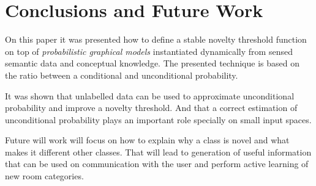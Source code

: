 \documentclass[runningheads,a4paper]{llncs}
\begin{document}
\section{Conclusions and Future Work}

On this paper it was presented how to define a stable novelty threshold function on top of
\emph{probabilistic graphical models} instantiated dynamically from sensed semantic data and
conceptual knowledge.
The presented technique is based on the ratio between a conditional and unconditional probability.

It was shown that unlabelled data can be used to approximate unconditional probability and
improve a novelty threshold.
And that a correct estimation of unconditional probability plays an important role specially on
small input spaces.

Future will work will focus on how to explain why a class is novel and what makes it different
other classes.
That will lead to generation of useful information that can be used on communication with the user
and perform active learning of new room categories.




\end{document}
